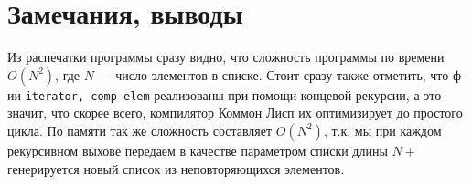 \documentclass[12pt]{article}
\begin{document}
\section{Замечания, выводы}
Из распечатки программы сразу видно, что сложность программы по времени $O(N^2)$, где $N$ --- число элементов в списке. Стоит сразу также отметить, что ф-ии {\color{blue}\tt{iterator, comp-elem}} реализованы при помощи концевой рекурсии, а это значит, что скорее всего, компилятор Коммон Лисп их оптимизирует до простого цикла. По памяти так же сложность составляет $O(N^2)$, т.к. мы при каждом рекурсивном выхове передаем в качестве параметром списки длины $N +$ генерируется новый список из неповторяющихся элементов.
\end{document}
